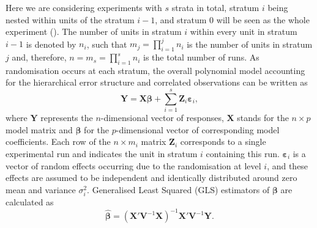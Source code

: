 Here we are considering experiments with $s$ strata in total, stratum $i$ being nested within units of the stratum $i-1$, and stratum $0$ will be seen as the whole experiment (\citet{Trinca2015improved}). The number of units in stratum $i$ within every unit in stratum $i-1$ is denoted by $n_i$, such that $m_{j}=\prod_{i=1}^{j}n_{i}$ is the number of units in stratum $j$ and, therefore,  $n=m_{s}=\prod_{i=1}^{s}n_{i}$ is the total number of runs.  As randomisation occurs at each stratum, the overall  polynomial model accounting for the hierarchical error structure and correlated observations can be written as
\begin{equation}
\label{eq::MS_model}
\bm{Y}=\bm{X}\bm{\beta}+\sum_{i=1}^{s}\bm{Z}_{i}\bm{\varepsilon}_{i},
\end{equation}
where $\bm{Y}$ represents the $n$-dimensional vector of responses, $\bm{X}$ stands for the $n \times p$ model matrix and $\bm{\beta}$ for the $p$-dimensional vector of corresponding model coefficients. Each row of the $n\times m_{i}$ matrix $\bm{Z}_{i}$ corresponds to a single experimental run and indicates the unit in stratum $i$ containing this run. $\bm{\varepsilon}_{i}$ is a vector of random effects occurring due to the randomisation at level $i$, and these effects are assumed to be independent and identically distributed around zero mean and variance $\sigma^{2}_{i}$. Generalised Least Squared  (GLS) estimators of $\bm{\beta}$ are calculated as
\begin{equation}
\label{eq::MS_GLS}
\bm{\hat{\beta}}=(\bm{X}'\bm{V}^{-1}\bm{X})^{-1}\bm{X}'\bm{V}^{-1}\bm{Y}.
\end{equation}



